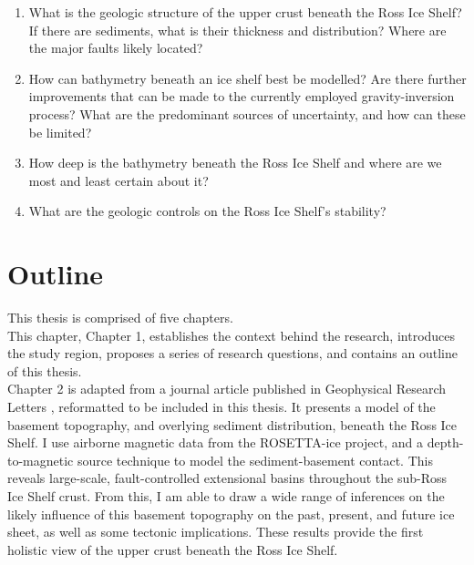 \begin{enumerate}
    \item 
    What is the geologic structure of the upper crust beneath the Ross Ice Shelf?
    If there are sediments, what is their thickness and distribution? 
    Where are the major faults likely located? 
    \item 
    How can bathymetry beneath an ice shelf best be modelled? 
    Are there further improvements that can be made to the currently employed gravity-inversion process? 
    What are the predominant sources of uncertainty, and how can these be limited? 
    \item 
    How deep is the bathymetry beneath the Ross Ice Shelf and where are we most and least certain about it? 
    \item 
    What are the geologic controls on the Ross Ice Shelf's stability? 
\end{enumerate}

\section{Outline}

This thesis is comprised of five chapters. \\

This chapter, Chapter 1, establishes the context behind the research, introduces the study region, proposes a series of research questions, and contains an outline of this thesis. \\

Chapter 2 is adapted from a journal article published in Geophysical Research Letters  \citep{tankersleybasement2022}, reformatted to be included in this thesis. 
It presents a model of the basement topography, and overlying sediment distribution, beneath the Ross Ice Shelf. I use airborne magnetic data from the ROSETTA-ice project, and a depth-to-magnetic source technique to model the sediment-basement contact. This reveals large-scale, fault-controlled extensional basins throughout the sub-Ross Ice Shelf crust. From this, I am able to draw a wide range of inferences on the likely influence of this basement topography on the past, present, and future ice sheet, as well as some tectonic implications. These results provide the first holistic view of the upper crust beneath the Ross Ice Shelf. \\

